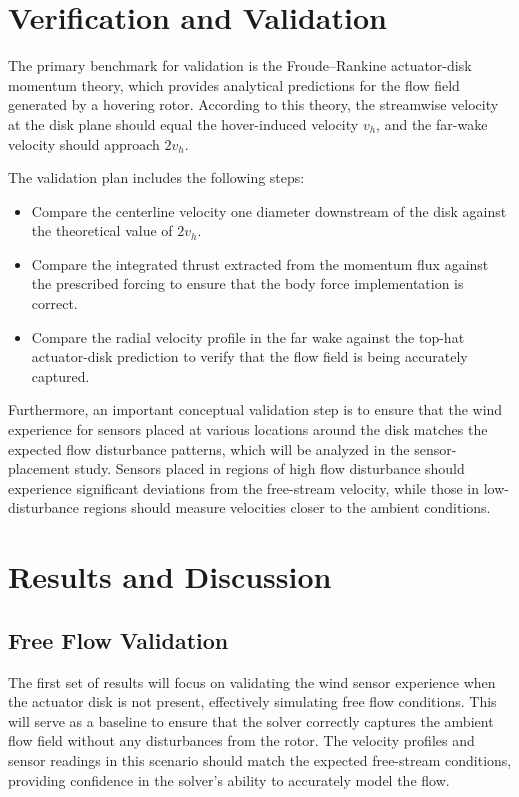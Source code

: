 \documentclass[
  aapm,
  amsmath,amssymb,
  reprint,          %
  floatfix
]{revtex4-2}
\begin{document}
\section{Verification and Validation}
The primary benchmark for validation is the Froude--Rankine actuator-disk momentum theory, 
which provides analytical predictions for the flow field generated by a hovering rotor. 
According to this theory, the streamwise velocity at the disk plane should equal the 
hover-induced velocity $v_{h}$, and the far-wake velocity should approach $2v_{h}$.

The validation plan includes the following steps:
\begin{itemize}
    \item Compare the centerline velocity one diameter downstream of the disk against the theoretical value of $2v_{h}$.
    \item Compare the integrated thrust extracted from the momentum flux against the prescribed forcing to ensure that the body force implementation is correct.
    \item Compare the radial velocity profile in the far wake against the top-hat actuator-disk prediction to verify that the flow field is being accurately captured.
\end{itemize}

Furthermore, an important conceptual validation step is to ensure that the wind experience
for sensors placed at various locations around the disk matches the expected flow 
disturbance patterns, which will be analyzed in the sensor-placement study. Sensors placed 
in regions of high flow disturbance should experience significant deviations from the 
free-stream velocity, while those in low-disturbance regions should measure velocities 
closer to the ambient conditions. 

\section{Results and Discussion}

\subsection{Free Flow Validation}
The first set of results will focus on validating the wind sensor experience when the 
actuator disk is not present, effectively simulating free flow conditions. This will 
serve as a baseline to ensure that the solver correctly captures the ambient flow field 
without any disturbances from the rotor. The velocity profiles and sensor readings 
in this scenario should match the expected free-stream conditions, providing confidence 
in the solver's ability to accurately model the flow.
\end{document}
